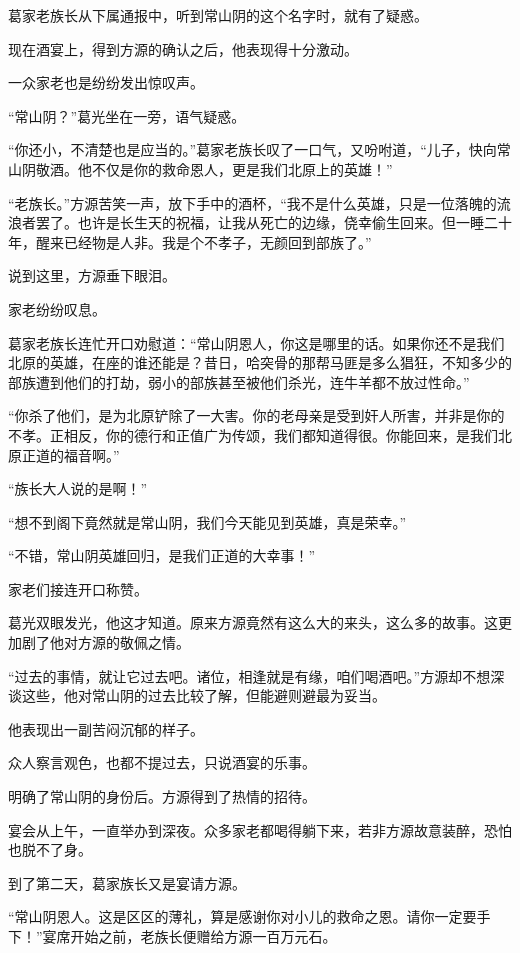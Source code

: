 
\begin{this_body}

葛家老族长从下属通报中，听到常山阴的这个名字时，就有了疑惑。

现在酒宴上，得到方源的确认之后，他表现得十分激动。

一众家老也是纷纷发出惊叹声。

“常山阴？”葛光坐在一旁，语气疑惑。

“你还小，不清楚也是应当的。”葛家老族长叹了一口气，又吩咐道，“儿子，快向常山阴敬酒。他不仅是你的救命恩人，更是我们北原上的英雄！”

“老族长。”方源苦笑一声，放下手中的酒杯，“我不是什么英雄，只是一位落魄的流浪者罢了。也许是长生天的祝福，让我从死亡的边缘，侥幸偷生回来。但一睡二十年，醒来已经物是人非。我是个不孝子，无颜回到部族了。”

说到这里，方源垂下眼泪。

家老纷纷叹息。

葛家老族长连忙开口劝慰道：“常山阴恩人，你这是哪里的话。如果你还不是我们北原的英雄，在座的谁还能是？昔日，哈突骨的那帮马匪是多么猖狂，不知多少的部族遭到他们的打劫，弱小的部族甚至被他们杀光，连牛羊都不放过性命。”

“你杀了他们，是为北原铲除了一大害。你的老母亲是受到奸人所害，并非是你的不孝。正相反，你的德行和正值广为传颂，我们都知道得很。你能回来，是我们北原正道的福音啊。”

“族长大人说的是啊！”

“想不到阁下竟然就是常山阴，我们今天能见到英雄，真是荣幸。”

“不错，常山阴英雄回归，是我们正道的大幸事！”

家老们接连开口称赞。

葛光双眼发光，他这才知道。原来方源竟然有这么大的来头，这么多的故事。这更加剧了他对方源的敬佩之情。

“过去的事情，就让它过去吧。诸位，相逢就是有缘，咱们喝酒吧。”方源却不想深谈这些，他对常山阴的过去比较了解，但能避则避最为妥当。

他表现出一副苦闷沉郁的样子。

众人察言观色，也都不提过去，只说酒宴的乐事。

明确了常山阴的身份后。方源得到了热情的招待。

宴会从上午，一直举办到深夜。众多家老都喝得躺下来，若非方源故意装醉，恐怕也脱不了身。

到了第二天，葛家族长又是宴请方源。

“常山阴恩人。这是区区的薄礼，算是感谢你对小儿的救命之恩。请你一定要手下！”宴席开始之前，老族长便赠给方源一百万元石。


\end{this_body}
